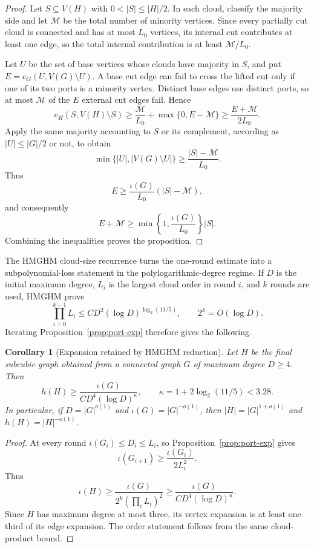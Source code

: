 \documentclass[11pt]{amsart}
\newtheorem{corollary}[theorem]{Corollary}
\theoremstyle{definition}
\newcommand{\iotae}{\iota}
\begin{document}
\begin{proof}
Let $S\subseteq V(H)$ with $0<|S|\le|H|/2$.  In each cloud, classify the
majority side and let $\mathcal M$ be the total number of minority vertices.  Since
every partially cut cloud is connected and has at most $L_0$ vertices, its
internal cut contributes at least one edge, so the total internal contribution
is at least $\mathcal M/L_0$.

Let $U$ be the set of base vertices whose clouds have majority in $S$, and
put $E=e_G(U,V(G)\setminus U)$.  A base cut edge can fail to cross the lifted
cut only if one of its two ports is a minority vertex.  Distinct base edges
use distinct ports, so at most $\mathcal M$ of the $E$ external cut edges fail.  Hence
\[
 e_H(S,V(H)\setminus S)
 \ge
 \frac{\mathcal M}{L_0}+\max\{0,E-\mathcal M\}
 \ge
 \frac{E+\mathcal M}{2L_0}.
\]
Apply the same majority accounting to $S$ or its complement, according as
$|U|\le|G|/2$ or not, to obtain
\[
 \min\{|U|,|V(G)\setminus U|\}
 \ge
 \frac{|S|-\mathcal M}{L_0}.
\]
Thus
\[
 E\ge\frac{\iotae(G)}{L_0}(|S|-\mathcal M),
\]
and consequently
\[
 E+\mathcal M
 \ge
 \min\left\{1,\frac{\iotae(G)}{L_0}\right\}|S|.
\]
Combining the inequalities proves the proposition.
\end{proof}

The HMGHM cloud-size recurrence turns the one-round estimate into a
subpolynomial-loss statement in the polylogarithmic-degree regime.  If $D$
is the initial maximum degree, $L_i$ is the largest cloud order in round $i$,
and $k$ rounds are used, HMGHM prove
\[
 \prod_{i=0}^{k-1}L_i
 \le C D^2(\log D)^{\log_2(11/5)},
 \qquad
 2^k=O(\log D).
\]
Iterating Proposition~\ref{prop:port-exp} therefore gives the following.

\begin{corollary}[Expansion retained by HMGHM reduction]\label{cor:exp-retention}
Let $H$ be the final subcubic graph obtained from a connected graph $G$ of
maximum degree $D\ge4$.  Then
\[
 \boxed{
 h(H)
 \ge
 \frac{\iotae(G)}{C D^4(\log D)^{\kappa}},
 \qquad
 \kappa=1+2\log_2(11/5)<3.28.
 }
\]
In particular, if $D=|G|^{o(1)}$ and $\iotae(G)=|G|^{-o(1)}$, then
$|H|=|G|^{1+o(1)}$ and $h(H)=|H|^{-o(1)}$.
\end{corollary}

\begin{proof}
At every round $\iotae(G_i)\le D_i\le L_i$, so
Proposition~\ref{prop:port-exp} gives
\[
 \iotae(G_{i+1})\ge\frac{\iotae(G_i)}{2L_i^2}.
\]
Thus
\[
 \iotae(H)
 \ge
 \frac{\iotae(G)}{2^k(\prod_iL_i)^2}
 \ge
 \frac{\iotae(G)}{C D^4(\log D)^\kappa}.
\]
Since $H$ has maximum degree at most three, its vertex expansion is at least
one third of its edge expansion.  The order statement follows from the same
cloud-product bound.
\end{proof}
\end{document}
